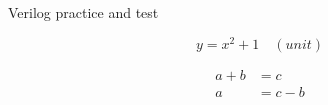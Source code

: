 \documentclass{article}
\begin{document}
Verilog practice and test

\begin{equation}
    y = x^2 + 1 \quad(unit)
\end{equation}

\begin{align}
    a + b &= c \\        
        a &= c - b
\end{align}

\printindex
\end{document}
